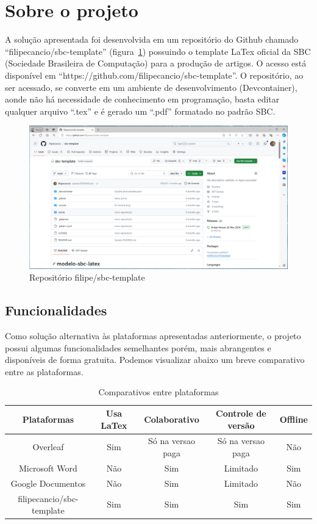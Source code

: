 \section{Sobre o projeto}

A solução apresentada foi desenvolvida em um repositório do Github chamado ``filipecancio/sbc-template'' (figura~\ref{fig:fig10}) possuindo o template LaTex oficial da SBC (Sociedade Brasileira de Computação) para a produção de artigos. O acesso está disponível em ``https://github.com/filipecancio/sbc-template''. O repositório, ao ser acessado, se converte em um ambiente de desenvolvimento (Devcontainer), aonde não há necessidade de conhecimento em programação, basta editar qualquer arquivo ``.tex'' e é gerado um ``.pdf'' formatado no padrão SBC.

\begin{figure}[ht]
	\centering
	\includegraphics[width=.7\textwidth]{./images/fig10.png}
	\caption{Repositório filipe/sbc-template}
	\label{fig:fig10}
\end{figure}

\subsection{Funcionalidades}

Como solução alternativa às plataformas apresentadas anteriormente, o projeto possui algumas funcionalidades semelhantes porém, mais abrangentes e disponíveis de forma gratuita. Podemos visualizar abaixo um breve comparativo entre as plataformas.

\begin{table}[ht]
	\centering
	\begin{tabular}{|c|c|c|c|c|}
		\hline
		Plataformas & Usa LaTex & Colaborativo & Controle de versão & Offline
		\\
		\hline
		Overleaf & Sim & Só na versao paga & Só na versao paga & Não \\
		\hline
		Microsoft Word & Não & Sim & Limitado & Sim \\
		\hline
		Google Documentos & Não & Sim & Limitado & Não \\
		\hline
		filipecancio/sbc-template & Sim & Sim & Sim & Sim \\
		\hline
	\end{tabular}
	\caption{Comparativos entre plataformas}
	\label{tab:tabela01}
\end{table}

